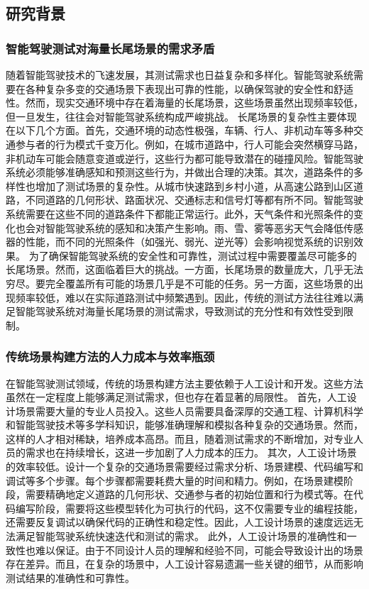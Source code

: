 \documentclass{article}
\begin{document}
\subsection{研究背景}
\subsubsection{智能驾驶测试对海量长尾场景的需求矛盾}
随着智能驾驶技术的飞速发展，其测试需求也日益复杂和多样化。智能驾驶系统需要在各种复杂多变的交通场景下表现出可靠的性能，以确保驾驶的安全性和舒适性。然而，现实交通环境中存在着海量的长尾场景，这些场景虽然出现频率较低，但一旦发生，往往会对智能驾驶系统构成严峻挑战。
长尾场景的复杂性主要体现在以下几个方面。首先，交通环境的动态性极强，车辆、行人、非机动车等多种交通参与者的行为模式千变万化。例如，在城市道路中，行人可能会突然横穿马路，非机动车可能会随意变道或逆行，这些行为都可能导致潜在的碰撞风险。智能驾驶系统必须能够准确感知和预测这些行为，并做出合理的决策。其次，道路条件的多样性也增加了测试场景的复杂性。从城市快速路到乡村小道，从高速公路到山区道路，不同道路的几何形状、路面状况、交通标志和信号灯等都有所不同。智能驾驶系统需要在这些不同的道路条件下都能正常运行。此外，天气条件和光照条件的变化也会对智能驾驶系统的感知和决策产生影响。雨、雪、雾等恶劣天气会降低传感器的性能，而不同的光照条件（如强光、弱光、逆光等）会影响视觉系统的识别效果。
为了确保智能驾驶系统的安全性和可靠性，测试过程中需要覆盖尽可能多的长尾场景。然而，这面临着巨大的挑战。一方面，长尾场景的数量庞大，几乎无法穷尽。要完全覆盖所有可能的场景几乎是不可能的任务。另一方面，这些场景的出现频率较低，难以在实际道路测试中频繁遇到。因此，传统的测试方法往往难以满足智能驾驶系统对海量长尾场景的测试需求，导致测试的充分性和有效性受到限制。

\subsubsection{传统场景构建方法的人力成本与效率瓶颈}
在智能驾驶测试领域，传统的场景构建方法主要依赖于人工设计和开发。这些方法虽然在一定程度上能够满足测试需求，但也存在着显著的局限性。
首先，人工设计场景需要大量的专业人员投入。这些人员需要具备深厚的交通工程、计算机科学和智能驾驶技术等多学科知识，能够准确理解和模拟各种复杂的交通场景。然而，这样的人才相对稀缺，培养成本高昂。而且，随着测试需求的不断增加，对专业人员的需求也在持续增长，这进一步加剧了人力成本的压力。
其次，人工设计场景的效率较低。设计一个复杂的交通场景需要经过需求分析、场景建模、代码编写和调试等多个步骤。每个步骤都需要耗费大量的时间和精力。例如，在场景建模阶段，需要精确地定义道路的几何形状、交通参与者的初始位置和行为模式等。在代码编写阶段，需要将这些模型转化为可执行的代码，这不仅需要专业的编程技能，还需要反复调试以确保代码的正确性和稳定性。因此，人工设计场景的速度远远无法满足智能驾驶系统快速迭代和测试的需求。
此外，人工设计场景的准确性和一致性也难以保证。由于不同设计人员的理解和经验不同，可能会导致设计出的场景存在差异。而且，在复杂的场景中，人工设计容易遗漏一些关键的细节，从而影响测试结果的准确性和可靠性。
\end{document}

